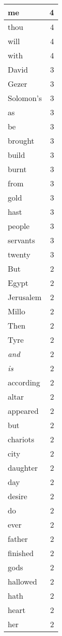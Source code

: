 \begin{center}
\begin{longtable}{l|r}
me & 4 \\ \hline
thou & 4 \\ \hline
will & 4 \\ \hline
with & 4 \\ \hline
David & 3 \\ \hline
Gezer & 3 \\ \hline
Solomon's & 3 \\ \hline
as & 3 \\ \hline
be & 3 \\ \hline
brought & 3 \\ \hline
build & 3 \\ \hline
burnt & 3 \\ \hline
from & 3 \\ \hline
gold & 3 \\ \hline
hast & 3 \\ \hline
people & 3 \\ \hline
servants & 3 \\ \hline
twenty & 3 \\ \hline
But & 2 \\ \hline
Egypt & 2 \\ \hline
Jerusalem & 2 \\ \hline
Millo & 2 \\ \hline
Then & 2 \\ \hline
Tyre & 2 \\ \hline
\emph{and} & 2 \\ \hline
\emph{is} & 2 \\ \hline
according & 2 \\ \hline
altar & 2 \\ \hline
appeared & 2 \\ \hline
but & 2 \\ \hline
chariots & 2 \\ \hline
city & 2 \\ \hline
daughter & 2 \\ \hline
day & 2 \\ \hline
desire & 2 \\ \hline
do & 2 \\ \hline
ever & 2 \\ \hline
father & 2 \\ \hline
finished & 2 \\ \hline
gods & 2 \\ \hline
hallowed & 2 \\ \hline
hath & 2 \\ \hline
heart & 2 \\ \hline
her & 2 \\ \hline

\end{longtable}
\end{center}

